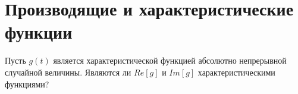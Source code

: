 \section{Производящие и характеристические функции}

\begin{problem}
Пусть $g(t)$ является характеристической функцией абсолютно непрерывной случайной величины. Являются ли $Re[g]$ и $Im[g]$ характеристическими функциями?
\end{problem}
